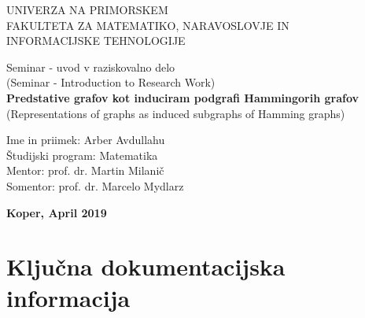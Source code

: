 \documentclass[12pt,a4paper,titlepage,openany]{report}
\begin{document}
\pagestyle{empty}
\begin{center}
\noindent \large UNIVERZA NA PRIMORSKEM\\
\large FAKULTETA ZA MATEMATIKO, NARAVOSLOVJE IN\\
INFORMACIJSKE TEHNOLOGIJE


\normalsize
\vspace{5.5cm}
Seminar - uvod v raziskovalno delo\\
(Seminar - Introduction to Research Work)\\
\textbf{\large Predstative grafov kot induciram podgrafi Hammingorih grafov}\\
\normalsize
(Representations of graphs as induced subgraphs of Hamming graphs)\\
\end{center}

\begin{flushleft}
\vspace{5cm}
\noindent Ime in priimek: Arber Avdullahu
\\
\noindent \v Studijski program: Matematika
\\
\noindent Mentor: prof. dr. Martin Milani\v c
\\
\noindent Somentor: prof. dr. Marcelo Mydlarz
\\
\end{flushleft}

\vspace{4cm}
\begin{center}
\large \textbf{Koper, April 2019}
\end{center}
\newpage

\pagestyle{fancy}

\section*{Klju\v cna dokumentacijska informacija}
\end{document}
